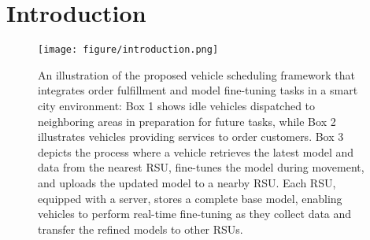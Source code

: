 \section{Introduction}
\begin{figure}[ht]
\centerline{\texttt{[image: figure/introduction.png]}}
\caption{
An illustration of the proposed vehicle scheduling framework that integrates order fulfillment and model fine-tuning tasks in a smart city environment: Box 1 shows idle vehicles dispatched to neighboring areas in preparation for future tasks, while Box 2 illustrates vehicles providing services to order customers. Box 3 depicts the process where a vehicle retrieves the latest model and data from the nearest RSU, fine-tunes the model during movement, and uploads the updated model to a nearby RSU. Each RSU, equipped with a server, stores a complete base model, enabling vehicles to perform real-time fine-tuning as they collect data and transfer the refined models to other RSUs.
}
\label{fig:system overview}
\end{figure}



